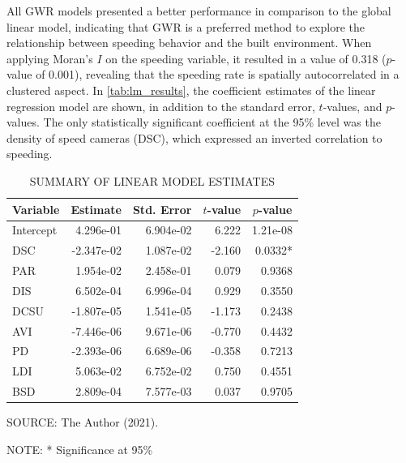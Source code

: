 All GWR models presented a better performance in comparison to the global linear model, indicating that GWR is a preferred method to explore the relationship between speeding behavior and the built environment. When applying Moran's $I$ on the speeding variable, it resulted in a value of 0.318 ($p$-value of 0.001), revealing that the speeding rate is spatially autocorrelated in a clustered aspect. In \autoref{tab:lm_results}, the coefficient estimates of the linear regression model are shown, in addition to the standard error, $t$-values, and $p$-values. The only statistically significant coefficient at the 95\% level was the density of speed cameras (DSC), which expressed an inverted correlation to speeding.


\begin{table}[!htbp]
    \footnotesize
    \captionsetup{justification=raggedright,
        singlelinecheck=false,
        font=footnotesize}
    \caption{SUMMARY OF LINEAR MODEL ESTIMATES}
    \centering
    \begin{tabular}{lrrrr}
        \hline
        \multicolumn{1}{c}{\textbf{Variable}} & \multicolumn{1}{c}{\textbf{Estimate}} & \multicolumn{1}{c}{\textbf{Std. Error}} & \multicolumn{1}{c}{\textbf{$t$-value}} & \multicolumn{1}{c}{\textbf{$p$-value}}  \\
        \hline
        Intercept & 4.296e-01 & 6.904e-02 & 6.222 & 1.21e-08 \\
        DSC       & -2.347e-02 & 1.087e-02 & -2.160 & 0.0332* \\ 
        PAR       & 1.954e-02 & 2.458e-01 & 0.079 & 0.9368 \\   
        DIS       & 6.502e-04 & 6.996e-04 & 0.929 & 0.3550 \\   
        DCSU      & -1.807e-05 & 1.541e-05 & -1.173 & 0.2438 \\   
        AVI       & -7.446e-06 & 9.671e-06 & -0.770 & 0.4432 \\  
        PD        & -2.393e-06 & 6.689e-06 & -0.358 & 0.7213 \\   
        LDI       & 5.063e-02 & 6.752e-02 & 0.750 & 0.4551 \\   
        BSD       & 2.809e-04 & 7.577e-03 & 0.037 & 0.9705 \\
        \hline
    \end{tabular}
    \label{tab:lm_results}
    \par \vspace{2mm} \footnotesize \raggedright
    SOURCE: The Author (2021).
    \par 
    NOTE: * Significance at 95\%
\end{table}

